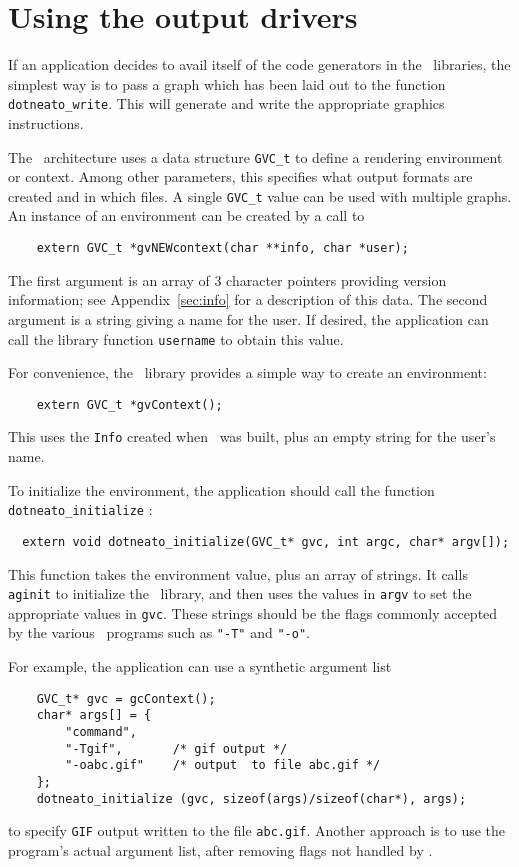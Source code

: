\section{Using the output drivers}
\label{sec:drivers}

If an application decides to avail itself of the code generators
in the \gviz\ libraries, the simplest way is to pass a graph
which has been laid out to the function \verb+dotneato_write+.
This will generate and write the appropriate graphics instructions.

The \gviz\ architecture uses a data structure {\tt GVC\_t} to
define a rendering environment or context. Among other parameters,
this specifies what output formats are created and in which files.
A single {\tt GVC\_t} value can be used with multiple graphs.
An instance of an environment can be created by a call to
\begin{verbatim}
    extern GVC_t *gvNEWcontext(char **info, char *user);
\end{verbatim}
The first argument is an array of 3 character pointers
providing version information; see Appendix~\ref{sec:info} for a
description of this data. The second argument is a string giving a
name for the user. If desired, the application can call the library
function {\tt username} to obtain this value.

For convenience, the \gviz\ library provides a simple way to 
create an environment:
\begin{verbatim}
    extern GVC_t *gvContext();
\end{verbatim}
This uses the {\tt Info} created when \gviz\ was built, plus
an empty string for the user's name.

To initialize the environment, the application should
call the function \verb+dotneato_initialize+ :
\begin{verbatim}
  extern void dotneato_initialize(GVC_t* gvc, int argc, char* argv[]);
\end{verbatim}
This function takes the environment value, plus an array of strings.
It calls {\tt aginit} to initialize the \graph\ library, and then
uses the values in {\tt argv} to set the appropriate values in {\tt gvc}.
These strings should be the flags commonly accepted by the various
\gviz\ programs such as {\tt "-T"} and {\tt "-o"}.

For example, the application can use a synthetic argument list
\begin{verbatim}
    GVC_t* gvc = gcContext();
    char* args[] = {
        "command",
        "-Tgif",       /* gif output */
        "-oabc.gif"    /* output  to file abc.gif */
    };
    dotneato_initialize (gvc, sizeof(args)/sizeof(char*), args);
\end{verbatim}
to specify {\tt GIF} output written to the file {\tt abc.gif}.
Another approach is to use the program's actual argument list, 
after removing flags not handled by \gviz.
 
